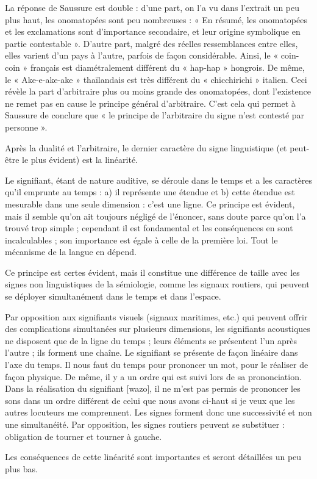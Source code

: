 La réponse de Saussure est double : d’une part, on l’a vu dans l’extrait un peu plus haut, les onomatopées sont peu nombreuses : « En résumé, les onomatopées et les exclamations sont d’importance secondaire, et leur origine symbolique en partie contestable ». D’autre part, malgré des réelles ressemblances entre elles, elles varient d’un pays à l’autre, parfois de façon considérable. Ainsi, le « coin-coin » français est diamétralement différent du « hap-hap » hongrois. De même, le « Ake-e-ake-ake » thaïlandais est très différent du « chicchirichi » italien. Ceci révèle la part d’arbitraire plus ou moins grande des onomatopées, dont l’existence ne remet pas en cause le principe général d’arbitraire. C’est cela qui permet à Saussure de conclure que « le principe de l’arbitraire du signe n’est contesté par personne ».

Après la dualité et l’arbitraire, le dernier caractère du signe linguistique (et peut-être le plus évident) est la linéarité.
\begin{lecture}{}
Le signifiant, étant de nature auditive, se déroule dans le temps et a les caractères qu’il emprunte au temps : a) il représente une étendue et b) cette étendue est mesurable dans une seule dimension : c’est une ligne. Ce principe est évident, mais il semble qu’on ait toujours négligé de l’énoncer, sans doute parce qu’on l’a trouvé trop simple ; cependant il est fondamental et les conséquences en sont incalculables ; son importance est égale à celle de la première loi. Tout le mécanisme de la langue en dépend.
\end{lecture}
Ce principe est certes évident, mais il constitue une différence de taille avec les signes non linguistiques de la sémiologie, comme les signaux routiers, qui peuvent se déployer simultanément dans le temps et dans l’espace.

\begin{lecture}{}
Par opposition aux signifiants visuels (signaux maritimes, etc.) qui peuvent offrir des complications simultanées sur plusieurs dimensions, les signifiants acoustiques ne disposent que de la ligne du temps ; leurs éléments se présentent l’un après l’autre ; ils forment une chaîne. Le signifiant se présente de façon linéaire dans l’axe du temps. Il nous faut du temps pour prononcer un mot, pour le réaliser de façon physique. De même, il y a un ordre qui est suivi lors de sa prononciation. Dans la réalisation du signifiant [wazo], il ne m’est pas permis de prononcer les sons dans un ordre différent de celui que nous avons ci-haut si je veux que les autres locuteurs me comprennent. Les signes forment donc une successivité et non une simultanéité. Par opposition, les signes routiers peuvent se substituer : obligation de tourner et tourner à gauche.
\end{lecture}
Les conséquences de cette linéarité sont importantes et seront détaillées un peu plus bas.


